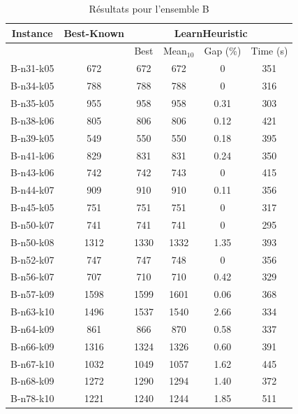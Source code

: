 \documentclass[a4paper,11pt]{article}%
\begin{document}
\begin{table}[h!]
\caption{Résultats pour l'ensemble B}
\label{TB}
\begin{center}
\begin{tabular}{|@{}c@{}|@{}c@{}|@{}c@{}|@{}c@{}|@{}c@{}|@{}c@{}|}

\hline
 Instance & Best-Known & \multicolumn{4}{c|}{LearnHeuristic}  \\
 \hline
 & & Best & Mean$_{10}$ & Gap (\%) & Time (s) \\ 
 \hline
 B-n31-k05 & 672 & 672 & 672 & 0 & 351  \\
 \hline
 B-n34-k05   & 788 & 788 & 788 &0 & 316   \\
  \hline
   B-n35-k05 & 955 & 958 & 958 &0.31 & 303  \\
 \hline
   B-n38-k06 & 805 & 806 & 806 &0.12 & 421  \\
  \hline
   B-n39-k05 & 549 & 550 & 550 & 0.18 & 395  \\
 \hline
  B-n41-k06  & 829 & 831 & 831 & 0.24 & 350  \\
  \hline
  B-n43-k06 & 742 & 742 & 743 & 0 & 415 \\
 \hline
  B-n44-k07  & 909 & 910 & 910 & 0.11 & 356 \\
 \hline
 B-n45-k05 & 751 & 751 & 751 & 0 & 317 \\
 \hline
   B-n50-k07 & 741 & 741 & 741 & 0 & 295   \\
  \hline
   B-n50-k08 & 1312 & 1330 & 1332 & 1.35 & 393  \\
  \hline
  B-n52-k07  & 747 & 747 & 748 &0 & 356  \\
  \hline
  B-n56-k07 & 707 & 710 & 710 & 0.42 & 329  \\
 \hline
  B-n57-k09  & 1598 & 1599 & 1601 &0.06 & 368   \\
  \hline
  B-n63-k10  & 1496 & 1537 & 1540 & 2.66 & 334   \\
  \hline
  B-n64-k09 & 861 & 866 & 870 & 0.58 & 337 \\
 \hline 
   B-n66-k09 & 1316 & 1324 & 1326 &0.60 & 391   \\
  \hline 
  B-n67-k10  & 1032 & 1049 & 1057 &1.62 & 445  \\
  \hline
    B-n68-k09  & 1272 & 1290 & 1294 &1.40 & 372   \\
  \hline
    B-n78-k10  & 1221 & 1240 & 1244 &1.85 & 511   \\
  \hline
\end{tabular}
\end{center}
\end{table}
\end{document}
